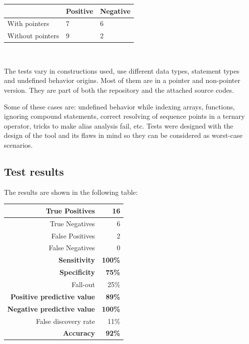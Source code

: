\begin{centering}
\begin{tabular}{|l|l|l|}
\hline
                 & Positive & Negative \\\hline
With pointers    & 7        & 6        \\\hline
Without pointers & 9        & 2        \\\hline
\end{tabular}\\
\end{centering}

The tests vary in constructions used, use different data types, statement types and undefined behavior origins. Most of them are in a pointer and non-pointer version. They are part of both the repository and the attached source codes.

Some of these cases are: undefined behavior while indexing arrays, functions, ignoring compound statements, correct resolving of sequence points in a ternary operator, tricks to make alias analysis fail, etc. Tests were designed with the design of the tool and its flaws in mind so they can be considered as worst-case scenarios.

\subsection{Test results}

The results are shown in the following table:

\begin{centering}
\begin{tabular}{|r|r|}
\hline
True Positives                         &             16   \\\hline
True Negatives                         &              6   \\\hline
False Positives                        &              2   \\\hline
False Negatives                        &              0   \\\hline\hline
\textbf{Sensitivity}                   & \textbf{100\%}   \\\hline
\textbf{Specificity}                   &  \textbf{75\%}   \\\hline
Fall-out                               &           25\%   \\\hline
\textbf{Positive predictive value}     &  \textbf{89\%}   \\\hline
\textbf{Negative predictive value}     & \textbf{100\%}   \\\hline
False discovery rate                   &            11\%   \\\hline\hline
\textbf{Accuracy}                      &  \textbf{92\%}   \\\hline
\end{tabular}\\
\end{centering}

